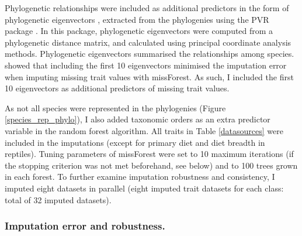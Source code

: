 Phylogenetic relationships were included as additional predictors in the form of phylogenetic eigenvectors \citep{Diniz-Filho2012}, extracted from the phylogenies using the PVR package \citep{Santos2018}. In this package, phylogenetic eigenvectors were computed from a phylogenetic distance matrix, and calculated using principal coordinate analysis methods. Phylogenetic eigenvectors summarised the relationships among species. \citet{Penone2014} showed that including the first 10 eigenvectors minimised the imputation error when imputing missing trait values with missForest. As such, I included the first 10 eigenvectors as additional predictors of missing trait values.

As not all species were represented in the phylogenies (Figure \ref{species_rep_phylo}), I also added taxonomic orders as an extra predictor variable in the random forest algorithm. All traits in Table \ref{datasources} were included in the imputations (except for primary diet and diet breadth in reptiles). Tuning parameters of missForest were set to 10 maximum iterations (if the stopping criterion was not met beforehand, see below) and to 100 trees grown in each forest. To further examine imputation robustness and consistency, I imputed eight datasets in parallel (eight imputed trait datasets for each class: total of 32 imputed datasets).

\subsubsection{Imputation error and robustness.}

